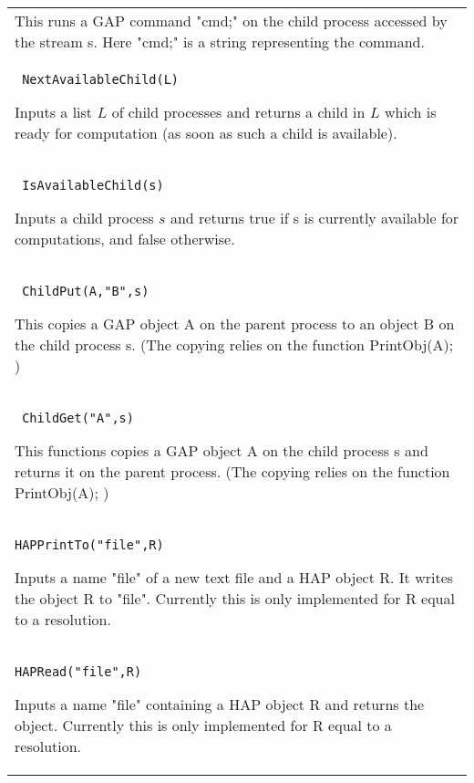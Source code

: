 \documentclass[a4paper,11pt]{report}
\begin{document}
{\begin{center}
\begin{tabular}{|l|}
 This runs a GAP command "cmd;" on the child process accessed by the stream s.
Here "cmd;" is a string representing the command. \\
 \index{NextAvailableChild} \texttt{ NextAvailableChild(L)} 

 Inputs a list $L$ of child processes and returns a child in $L$ which is ready for computation (as soon as such a child is available). \\
 \index{IsAvailableChild} \texttt{ IsAvailableChild(s)} 

 Inputs a child process $s$ and returns true if s is currently available for computations, and false
otherwise. \\
 \index{ChildPut} \texttt{ ChildPut(A,"B",s)} 

 This copies a GAP object A on the parent process to an object B on the child
process s. (The copying relies on the function PrintObj(A); ) \\
 \index{ChildGet} \texttt{ ChildGet("A",s)} 

 This functions copies a GAP object A on the child process s and returns it on
the parent process. (The copying relies on the function PrintObj(A); ) \\
 \index{HAPPrintTo} \texttt{HAPPrintTo("file",R)} 

 Inputs a name "file" of a new text file and a HAP object R. It writes the
object R to "file". Currently this is only implemented for R equal to a
resolution. \\
 \index{HAPRead} \texttt{HAPRead("file",R)} 

 Inputs a name "file" containing a HAP object R and returns the object.
Currently this is only implemented for R equal to a resolution. \\
\end{tabular}\\[2mm]
\end{center}

 }

 
\end{document}

